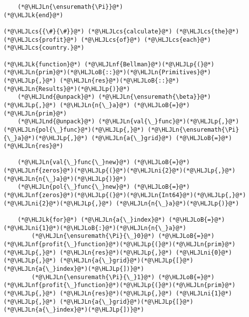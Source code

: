 \documentclass[12pt,a4paper]{article}
\newcommand{\HLJLk}[1]{\textcolor[RGB]{148,91,176}{\textbf{#1}}}
\newcommand{\HLJLn}[1]{#1}
\newcommand{\HLJLnd}[1]{\textcolor[RGB]{214,102,97}{#1}}
\newcommand{\HLJLnf}[1]{\textcolor[RGB]{66,102,213}{#1}}
\newcommand{\HLJLni}[1]{\textcolor[RGB]{59,151,46}{#1}}
\newcommand{\HLJLoB}[1]{\textcolor[RGB]{102,102,102}{\textbf{#1}}}
\newcommand{\HLJLp}[1]{#1}
\newcommand{\HLJLcs}[1]{\textcolor[RGB]{153,153,119}{\textit{#1}}}
\begin{document}
\begin{lstlisting}
    (*@\HLJLn{\ensuremath{\Pi}}@*)
(*@\HLJLk{end}@*)

(*@\HLJLcs{{\#}{\#}}@*) (*@\HLJLcs{calculate}@*) (*@\HLJLcs{the}@*) (*@\HLJLcs{profit}@*) (*@\HLJLcs{of}@*) (*@\HLJLcs{each}@*) (*@\HLJLcs{country.}@*)

(*@\HLJLk{function}@*) (*@\HLJLnf{Bellman}@*)(*@\HLJLp{(}@*)(*@\HLJLn{prim}@*)(*@\HLJLoB{::}@*)(*@\HLJLn{Primitives}@*)(*@\HLJLp{,}@*) (*@\HLJLn{res}@*)(*@\HLJLoB{::}@*)(*@\HLJLn{Results}@*)(*@\HLJLp{)}@*)
    (*@\HLJLnd{@unpack}@*) (*@\HLJLn{\ensuremath{\beta}}@*)(*@\HLJLp{,}@*) (*@\HLJLn{n{\_}a}@*) (*@\HLJLoB{=}@*) (*@\HLJLn{prim}@*)
    (*@\HLJLnd{@unpack}@*) (*@\HLJLn{val{\_}func}@*)(*@\HLJLp{,}@*) (*@\HLJLn{pol{\_}func}@*)(*@\HLJLp{,}@*) (*@\HLJLn{\ensuremath{\Pi}{\_}a}@*)(*@\HLJLp{,}@*) (*@\HLJLn{a{\_}grid}@*) (*@\HLJLoB{=}@*) (*@\HLJLn{res}@*)

    (*@\HLJLn{val{\_}func{\_}new}@*) (*@\HLJLoB{=}@*) (*@\HLJLnf{zeros}@*)(*@\HLJLp{(}@*)(*@\HLJLni{2}@*)(*@\HLJLp{,}@*) (*@\HLJLn{n{\_}a}@*)(*@\HLJLp{)}@*)
    (*@\HLJLn{pol{\_}func{\_}new}@*) (*@\HLJLoB{=}@*) (*@\HLJLnf{zeros}@*)(*@\HLJLp{(}@*)(*@\HLJLn{Int64}@*)(*@\HLJLp{,}@*) (*@\HLJLni{2}@*)(*@\HLJLp{,}@*) (*@\HLJLn{n{\_}a}@*)(*@\HLJLp{)}@*)

    (*@\HLJLk{for}@*) (*@\HLJLn{a{\_}index}@*) (*@\HLJLoB{=}@*) (*@\HLJLni{1}@*)(*@\HLJLoB{:}@*)(*@\HLJLn{n{\_}a}@*)
        (*@\HLJLn{\ensuremath{\Pi}{\_}0}@*) (*@\HLJLoB{=}@*) (*@\HLJLnf{profit{\_}function}@*)(*@\HLJLp{(}@*)(*@\HLJLn{prim}@*)(*@\HLJLp{,}@*) (*@\HLJLn{res}@*)(*@\HLJLp{,}@*) (*@\HLJLni{0}@*)(*@\HLJLp{,}@*) (*@\HLJLn{a{\_}grid}@*)(*@\HLJLp{[}@*)(*@\HLJLn{a{\_}index}@*)(*@\HLJLp{])}@*)
        (*@\HLJLn{\ensuremath{\Pi}{\_}1}@*) (*@\HLJLoB{=}@*) (*@\HLJLnf{profit{\_}function}@*)(*@\HLJLp{(}@*)(*@\HLJLn{prim}@*)(*@\HLJLp{,}@*) (*@\HLJLn{res}@*)(*@\HLJLp{,}@*) (*@\HLJLni{1}@*)(*@\HLJLp{,}@*) (*@\HLJLn{a{\_}grid}@*)(*@\HLJLp{[}@*)(*@\HLJLn{a{\_}index}@*)(*@\HLJLp{])}@*)


\end{lstlisting}
\end{document}
